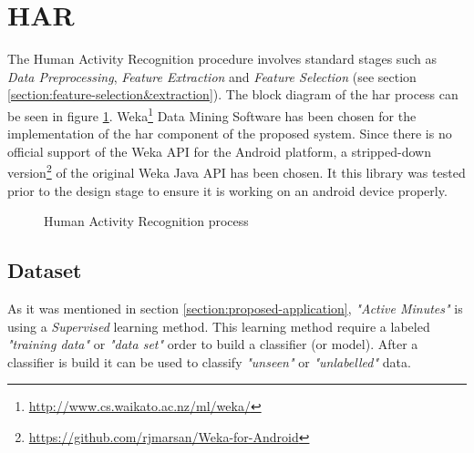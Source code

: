     \section{HAR}
    The Human Activity Recognition procedure involves standard stages such as \textit{Data Preprocessing}, \textit{Feature Extraction} and \textit{Feature Selection} (see section \ref{section:feature-selection&extraction}). The block diagram of the \gls{har} process can be seen in figure \ref{fig:har_process}. Weka\footnote{\url{http://www.cs.waikato.ac.nz/ml/weka/}} Data Mining Software has been chosen for the implementation of the \gls{har} component of the proposed system. Since there is no official support of the Weka API for the Android platform, a stripped-down version\footnote{\url{https://github.com/rjmarsan/Weka-for-Android}} of the original Weka Java API has been chosen. It this library was tested prior to the design stage to ensure it is working on an android device properly. 
    
    \begin{figure}[H]
        \centering
        \caption{Human Activity Recognition process}
        \label{fig:har_process}
    \end{figure}
    
    \subsection{Dataset}
    As it was mentioned in section \ref{section:proposed-application}, \textit{"Active Minutes"} is using a \textit{Supervised} learning method. This learning method require a labeled \textit{"training data"} or \textit{"data set"} order to build a classifier (or model). After a classifier is build it can be used to classify \textit{"unseen"} or \textit{"unlabelled"} data.
    
